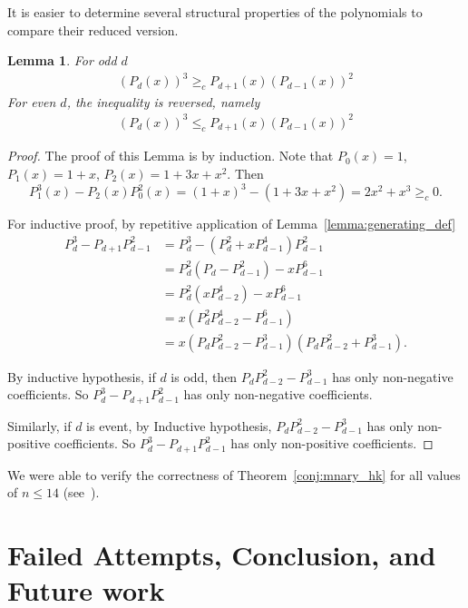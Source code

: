 \documentclass[10pt]{amsart}
\newtheorem{lemma}[theorem]{Lemma}
\theoremstyle{definition}
\begin{document}
It is easier to determine several structural properties of the polynomials to compare their reduced version.

\begin{lemma}
	For odd $d$
	\begin{align*}
		(P_{d }(x))^3 \geq_{c}  P_{d +1}(x)(P_{d -1}(x))^2
	\end{align*}
	For even $d$, the inequality is reversed, namely
	\begin{align*}
		(P_{d}(x))^3 \leq_{c}  P_{d +1}(x)(P_{d - 1}(x))^2
	\end{align*}
\end{lemma}
\begin{proof}
	The proof of this Lemma is by induction. Note that $P_{0}(x)=1$, $P_{1}(x)=1+x$, $P_2(x)=1+3x+x^2$. Then $$P_{1}^3(x)-P_{2}(x)P_{0}^2(x)=(1+x)^3-(1+3x+x^2)=2x^2+x^3\geq_{c}0.$$

	For inductive proof, by repetitive application of Lemma~\ref{lemma:generating_def}
	\begin{align*}
		P_{d}^{3}-P_{d+1}P_{d-1}^2 & =P_{d}^{3}-(P_{d}^2+xP_{d-1}^4)P_{d-1}^2                       \\
		                           & =P_{d}^2(P_{d}-P_{d-1}^2)-xP_{d-1}^6                           \\
		                           & = P_{d}^2(xP_{d-2}^4)-xP_{d-1}^{6}                             \\
		                           & = x(P_{d}^2 P_{d-2}^4 - P_{d-1}^6)                             \\
		                           & = x(P_{d} P_{d-2}^2 - P_{d-1}^3)(P_{d} P_{d-2}^2 + P_{d-1}^3).
	\end{align*}

	By inductive hypothesis, if $d$ is odd, then $P_{d} P_{d-2}^2 - P_{d-1}^3$ has only non-negative coefficients. So $P_{d}^{3}-P_{d+1}P_{d-1}^2$ has only non-negative coefficients.

	Similarly, if $d$ is event, by Inductive hypothesis, $P_{d} P_{d-2}^2 - P_{d-1}^3$ has only non-positive coefficients. So $P_{d}^{3}-P_{d+1}P_{d-1}^2$ has only non-positive coefficients.

\end{proof}

We were able to verify the correctness of Theorem~\ref{conj:mnary_hk} for all values of $n\leq 14$ (see~\cite{Maharjan_Exploring_Perfect_Binary}).


\section{Failed Attempts, Conclusion, and Future work}
\end{document}
